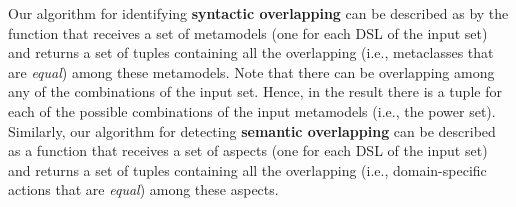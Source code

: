 Our algorithm for identifying \textbf{syntactic overlapping} can be described as by the function that receives a set of metamodels (one for each DSL of the input set) and returns a set of tuples containing all the overlapping (i.e., metaclasses that are \textit{equal}) among these metamodels. Note that there can be overlapping among any of the combinations of the input set. Hence, in the result there is a tuple for each of the possible combinations of the input metamodels (i.e., the power set). Similarly, our algorithm for detecting \textbf{semantic overlapping} can be described as a function that receives a set of aspects (one for each DSL of the input set) and returns a set of tuples containing all the overlapping (i.e., domain-specific actions that are \textit{equal}) among these aspects.








